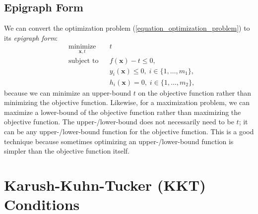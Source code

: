 \documentclass[lang=cn,10pt]{gorgeousnbook}
\numberwithin{equation}{section}%
\numberwithin{figure}{section}%
\begin{document}
\subsection{Epigraph Form}
We can convert the optimization problem (\ref{equation_optimization_problem}) to its \textit{epigraph form}:
\begin{equation}
\begin{aligned}
& \underset{\boldsymbol{x}, t}{\text{minimize}}
& & t \\
& \text{subject to}
& & f(\boldsymbol{x}) - t \leq 0, \\
& & & y_i(\boldsymbol{x}) \leq 0, \; i \in \{1, \ldots, m_1\}, \\
& & & h_i(\boldsymbol{x}) = 0, \; i \in \{1, \ldots, m_2\},
\end{aligned}
\end{equation}
because we can minimize an upper-bound $t$ on the objective function rather than minimizing the objective function.
Likewise, for a maximization problem, we can maximize a lower-bound of the objective function rather than maximizing the objective function.
The upper-/lower-bound does not necessarily need to be $t$; it can be any upper-/lower-bound function for the objective function.
This is a good technique because sometimes optimizing an upper-/lower-bound function is simpler than the objective function itself.

 
\section{Karush-Kuhn-Tucker (KKT) Conditions}
\end{document}

